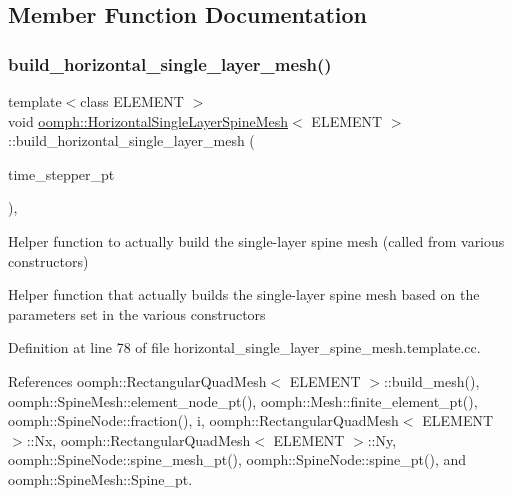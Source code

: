 \subsection{Member Function Documentation}
\mbox{\label{classoomph_1_1HorizontalSingleLayerSpineMesh_a9bd06cd24d2c48c499bf149b1773b442}} 
\subsubsection{\texorpdfstring{build\+\_\+horizontal\+\_\+single\+\_\+layer\+\_\+mesh()}{build\_horizontal\_single\_layer\_mesh()}}
{\footnotesize\ttfamily template$<$class E\+L\+E\+M\+E\+NT $>$ \\
void \hyperlink{classoomph_1_1HorizontalSingleLayerSpineMesh}{oomph\+::\+Horizontal\+Single\+Layer\+Spine\+Mesh}$<$ E\+L\+E\+M\+E\+NT $>$\+::build\+\_\+horizontal\+\_\+single\+\_\+layer\+\_\+mesh (\begin{DoxyParamCaption}\item[{\hyperlink{classoomph_1_1TimeStepper}{Time\+Stepper} $\ast$}]{time\+\_\+stepper\+\_\+pt }\end{DoxyParamCaption})\hspace{0.3cm}{\ttfamily [protected]}, {\ttfamily [virtual]}}



Helper function to actually build the single-\/layer spine mesh (called from various constructors) 

Helper function that actually builds the single-\/layer spine mesh based on the parameters set in the various constructors 

Definition at line 78 of file horizontal\+\_\+single\+\_\+layer\+\_\+spine\+\_\+mesh.\+template.\+cc.



References oomph\+::\+Rectangular\+Quad\+Mesh$<$ E\+L\+E\+M\+E\+N\+T $>$\+::build\+\_\+mesh(), oomph\+::\+Spine\+Mesh\+::element\+\_\+node\+\_\+pt(), oomph\+::\+Mesh\+::finite\+\_\+element\+\_\+pt(), oomph\+::\+Spine\+Node\+::fraction(), i, oomph\+::\+Rectangular\+Quad\+Mesh$<$ E\+L\+E\+M\+E\+N\+T $>$\+::\+Nx, oomph\+::\+Rectangular\+Quad\+Mesh$<$ E\+L\+E\+M\+E\+N\+T $>$\+::\+Ny, oomph\+::\+Spine\+Node\+::spine\+\_\+mesh\+\_\+pt(), oomph\+::\+Spine\+Node\+::spine\+\_\+pt(), and oomph\+::\+Spine\+Mesh\+::\+Spine\+\_\+pt.



